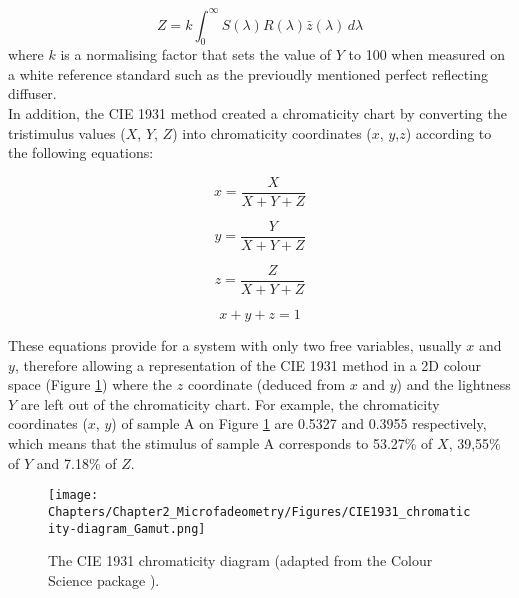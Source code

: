 \begin{equation}
    Z = k\int_{0}^{\infty} S(\lambda) R(\lambda) \bar{z}(\lambda) \,d\lambda
\label{eq:CIE_Z}
\end{equation}
where $k$ is a normalising factor that sets the value of $Y$ to 100 when measured on a white reference standard such as the previoudly mentioned perfect reflecting diffuser.\\

In addition, the \gls{CIE} 1931 method created a chromaticity chart by converting the tristimulus values ($X$, $Y$, $Z$) into chromaticity coordinates ($x$, $y$,$z$) according to the following equations:

\begin{equation}
    x = \frac{X}{X+Y+Z}
\label{eq:CIE_x}
\end{equation}

\begin{equation}
    y = \frac{Y}{X+Y+Z}
\label{eq:CIE_y}
\end{equation}

\begin{equation}
    z = \frac{Z}{X+Y+Z}
\label{eq:CIE_z}
\end{equation}

\begin{equation}
    x+y+z = 1
\label{eq:CIE_sum_xyz}
\end{equation}

These equations provide for a system with only two free variables, usually $x$ and $y$, therefore allowing a representation of the \gls{CIE} 1931 method in a 2D colour space (Figure \ref{fig:CIE_1931}) where the $z$ coordinate (deduced from $x$ and $y$) and the lightness $Y$ are left out of the chromaticity chart. For example, the chromaticity coordinates ($x$, $y$) of sample A on Figure \ref{fig:CIE_1931} are 0.5327 and 0.3955 respectively, which means that the stimulus of sample A corresponds to 53.27\% of $X$, 39,55\% of $Y$ and 7.18\% of $Z$. \\

\begin{figure}
\centering
\texttt{[image: Chapters/Chapter2\_Microfadeometry/Figures/CIE1931\_chromaticity-diagram\_Gamut.png]}
\caption[\hspace{0.3cm}The CIE 1931 chromaticity diagram.]{The \gls{CIE} 1931 chromaticity diagram (adapted from the Colour Science package \citep{mansencal_colour_2022}).}
\label{fig:CIE_1931}
\end{figure}

